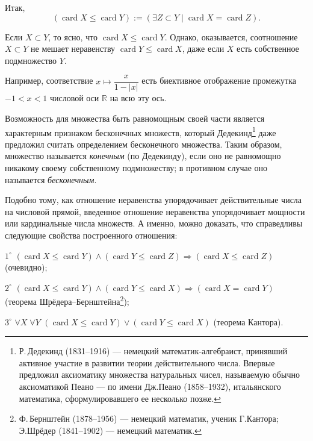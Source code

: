 Итак,
\[
  (\operatorname{card} X \leqslant \operatorname{card} Y) := (\exists Z \subset Y \mid \operatorname{card} X = \operatorname{card} Z).
\]

Если $X \subset Y$, то ясно, что $\operatorname{card} X \leqslant \operatorname{card} Y$. Однако, оказывается, соотношение $X \subset Y$ не мешает неравенству $\operatorname{card} Y \leqslant \operatorname{card} X$, даже если $X$ есть собственное подмножество $Y$.

Например, соответствие $x \mapsto \dfrac{x}{1 - |x|}$ есть биективное отображение
промежутка $-1 < x < 1$ числовой оси $\mathbb{R}$ на всю эту ось.

Возможность для множества быть равномощным своей части является
характерным признаком бесконечных множеств, который Дедекинд\footnote{Р.\,Дедекинд (1831--1916) --- немецкий математик-алгебраист, принявший активное
участие в развитии теории действительного числа. Впервые предложил аксиоматику
множества натуральных чисел, называемую обычно аксиоматикой Пеано --- по имени Дж.\;Пеано (1858--1932), итальянского математика, сформулировавшего ее несколько позже.} даже
предложил считать определением бесконечного множества. Таким образом,
множество называется \textit{конечным} (по Дедекинду), если оно не равномощно
никакому своему собственному подмножеству; в противном случае оно
называется \textit{бесконечным}.

Подобно тому, как отношение неравенства упорядочивает действительные числа на числовой прямой, введенное отношение неравенства упорядочивает мощности или кардинальные числа множеств. А именно, можно
доказать, что справедливы следующие свойства построенного отношения:

$1^\circ$ \; $(\operatorname{card} X \leqslant \operatorname{card} Y) \land (\operatorname{card} Y \leqslant \operatorname{card} Z) \Rightarrow (\operatorname{card} X \leqslant \operatorname{card} Z)$ \; (очевидно);

$2^\circ$ \; $(\operatorname{card} X \leqslant \operatorname{card} Y) \land (\operatorname{card} Y \leqslant \operatorname{card} X) \Rightarrow (\operatorname{card} X = \operatorname{card} Y)$ \; (теорема Шрёдера--Берн\-штей\-на\footnote{Ф.\,Бернштейн (1878--1956) --- немецкий математик, ученик Г.\;Кантора; Э.\;Шрёдер
(1841--1902) --- немецкий математик.});

$3^\circ$ \; $\forall X\; \forall Y$ \; $(\operatorname{card} X \leqslant \operatorname{card} Y) \lor (\operatorname{card} Y \leqslant \operatorname{card} X)$ \; (теорема Кантора).

